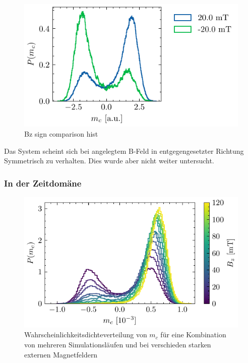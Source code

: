 \documentclass[main.tex]{subfiles}
\begin{document}
\begin{figure}[H]
    \centering
    \includegraphics{bilder/plots/Bz_sign_comparison/20mT_hist_comp.pdf}
    \caption{Bz sign comparison hist}\label{fig:bz-sign-hist}
\end{figure}

Das System scheint sich bei angelegtem B-Feld in entgegengesetzter Richtung Symmetrisch zu verhalten. Dies wurde aber nicht weiter untersucht.


\subsubsection{In der Zeitdomäne}

\begin{figure}[H]
    \centering
    \includegraphics{bilder/plots/max_Bz/mc_hist.pdf}
    \caption{Wahrscheinlichkeitsdichteverteilung von \(m_c\) für eine Kombination von mehreren Simulationsläufen und bei verschieden starken externen Magnetfeldern}\label{fig:b-hist}    
\end{figure}
\end{document}
